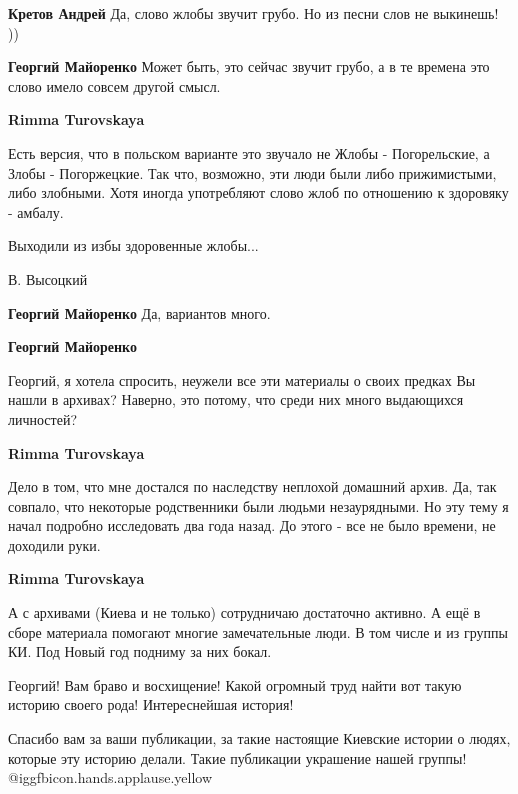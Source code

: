 \begin{itemize}
\begin{itemize}
\begin{itemize} %
\textbf{Кретов Андрей} Да, слово жлобы звучит грубо. Но из песни слов не выкинешь! ))

\textbf{Георгий Майоренко} Может быть, это сейчас звучит грубо, а в те времена это слово имело совсем другой смысл.

\textbf{Rimma Turovskaya} 

Есть версия, что в польском варианте это звучало не Жлобы - Погорельские, а
Злобы - Погоржецкие. Так что, возможно, эти люди были либо прижимистыми, либо
злобными. Хотя иногда употребляют слово жлоб по отношению к здоровяку - амбалу.

Выходили из избы
здоровенные жлобы...

В. Высоцкий

\textbf{Георгий Майоренко} Да, вариантов много.

\textbf{Георгий Майоренко} 

Георгий, я хотела спросить, неужели все эти материалы о своих предках Вы нашли
в архивах? Наверно, это потому, что среди них много выдающихся личностей?

\textbf{Rimma Turovskaya} 

Дело в том, что мне достался по наследству неплохой домашний архив. Да, так
совпало, что некоторые родственники были людьми незаурядными. Но эту тему я
начал подробно исследовать два года назад. До этого - все не было времени, не
доходили руки.


\textbf{Rimma Turovskaya} 

А с архивами (Киева и не только) сотрудничаю достаточно активно. А ещё в сборе
материала помогают многие замечательные люди. В том числе и из группы КИ. Под
Новый год подниму за них бокал.

\end{itemize} %

\end{itemize} %


Георгий! Вам браво и восхищение! Какой огромный труд найти вот такую историю
своего рода! Интереснейшая история!

Спасибо вам за ваши публикации, за такие настоящие Киевские истории о людях,
которые эту историю делали. Такие публикации украшение нашей группы! @igg{fbicon.hands.applause.yellow} 


\end{itemize}
